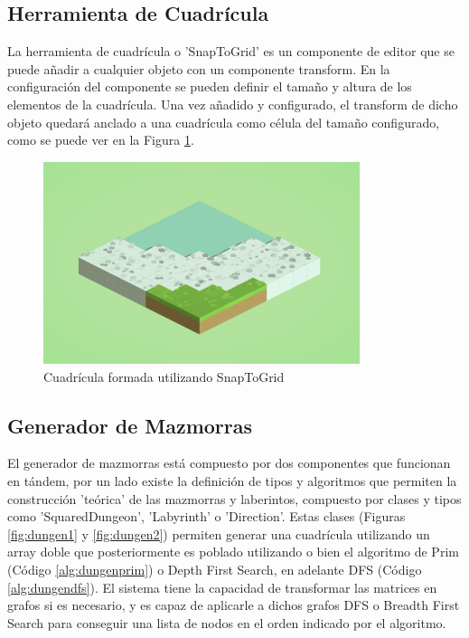 \subsection{Herramienta de Cuadrícula}
La herramienta de cuadrícula o 'SnapToGrid' es un componente de editor que se puede añadir a cualquier objeto con un componente transform. En la configuración del componente
 se pueden definir el tamaño y altura de los elementos de la cuadrícula. Una vez añadido y configurado, el transform de dicho objeto quedará anclado a una cuadrícula como 
 célula del tamaño configurado, como se puede ver en la Figura \ref{fig:snaptogrid}.

 \begin{figure}[H]
  \centering
    \includegraphics[width=350px,clip=true]{snaptogrid.png}
  \caption{Cuadrícula formada utilizando SnapToGrid}
  \label{fig:snaptogrid}
\end{figure}

\subsection{Generador de Mazmorras}
El generador de mazmorras está compuesto por dos componentes  que funcionan en tándem, por un lado existe la definición de tipos y algoritmos que permiten la construcción 
'teórica' de las mazmorras y laberintos, compuesto por clases y tipos como 'SquaredDungeon', 'Labyrinth' o 'Direction'. Estas clases (Figuras \ref{fig:dungen1} y \ref{fig:dungen2}) permiten generar una cuadrícula utilizando 
un array doble que posteriormente es poblado utilizando o bien el algoritmo de Prim (Código \ref{alg:dungenprim}) o Depth First Search, en adelante DFS (Código \ref{alg:dungendfs}). El sistema tiene la capacidad de transformar las matrices en grafos si es necesario, y es capaz de aplicarle a dichos grafos 
DFS o Breadth First Search para conseguir una lista de nodos en el orden indicado por el algoritmo.  

